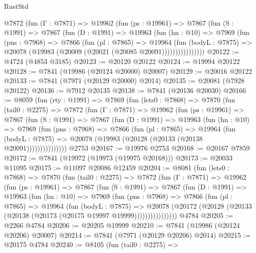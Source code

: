 \begin{lexlean}{RustStd}
\begin{coremodule}
{\begin{coremodule}
{{{{{{{{{{{{{{{{{{{{{{{{{{{{{{{{{{{{{{{{{{{{{{{{{{{{{{          @7872
            (fun (Γ : @7871) =>
            @19962
              (fun (ps : @19961) =>
              @7867
                (fun (S : @1991) =>
                @7867
                  (fun (D : @1991) =>
                  @19963
                    (fun (hn : @10) =>
                    @7969
                      (fun (pns : @7968) =>
                      @7866
                        (fun (pl : @7865) =>
                        @19964
                          (fun (bodyL : @7875) =>
                          @20078 (@19983 (@20009 (@20021 (@20085 @20091))))))))))))))))
@20122 := @4724 (@4853 @3185)
@20123 := @20120 @20122
@20124 := @19994 @20122
@20128 := @7841 (@19986 (@20124 @20000) @20007)
@20129 := @20016 @20122
@20133 := @7841 (@7971 (@20129 @20000) @2014)
@20135 := @20081 (@7928 @20122)
@20136 := @7912 @20135
@20138 := @7841 (@20136 @20030)
@20166 := @8059
    (fun (rty : @1991) =>
    @7869
      (fun (lets0 : @7868) =>
      @7870
        (fun (tail0 : @2275) =>
        @7872
          (fun (Γ : @7871) =>
          @19962
            (fun (ps : @19961) =>
            @7867
              (fun (S : @1991) =>
              @7867
                (fun (D : @1991) =>
                @19963
                  (fun (hn : @10) =>
                  @7969
                    (fun (pns : @7968) =>
                    @7866
                      (fun (pl : @7865) =>
                      @19964
                        (fun (bodyL : @7875) =>
                        @20078 (@19983 (@20128 (@20133 (@20138 @20091)))))))))))))))
    @2753
@20167 := @19976 @2753
@20168 := @20167 @7859
@20172 := @7841 (@19972 (@19973 (@19975 @20168)))
@20173 := @20033 @11095
@20175 := @11097 @20086 @12459
@20204 := @8081
    (fun (lets0 : @7868) =>
    @7870
      (fun (tail0 : @2275) =>
      @7872
        (fun (Γ : @7871) =>
        @19962
          (fun (ps : @19961) =>
          @7867
            (fun (S : @1991) =>
            @7867
              (fun (D : @1991) =>
              @19963
                (fun (hn : @10) =>
                @7969
                  (fun (pns : @7968) =>
                  @7866
                    (fun (pl : @7865) =>
                    @19964
                      (fun (bodyL : @7875) =>
                      @20078
                        (@20172
                          (@20128 (@20133 (@20138 (@20173 (@20175 @19997 @19999))))))))))))))))
    @4784
@20205 := @2266 @4784
@20206 := @20205 @19999
@20210 := @7841 (@19986 (@20124 @20206) @20007)
@20214 := @7841 (@7971 (@20129 @20206) @2014)
@20215 := @20175 @4784
@20240 := @8105
    (fun (tail0 : @2275) =>
}}}}}}}}}}}}}}}}}}}}}}}}}}}}}}}}}}}}}}}}}}}}}}}}}}}}}}
\end{coremodule}}
\end{coremodule}
\end{lexlean}
